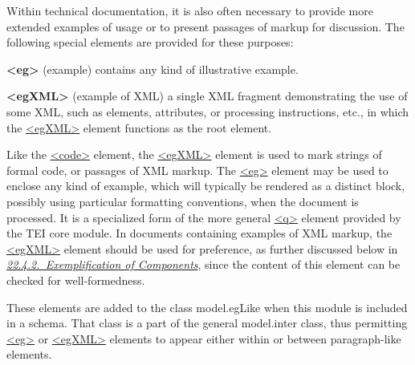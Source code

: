 Within technical documentation, it is also often necessary to provide more extended examples of usage or to present passages of markup for discussion. The following special elements are provided for these purposes: 
\begin{sansreflist}
  
\item [\textbf{<eg>}] (example) contains any kind of illustrative example.
\item [\textbf{<egXML>}] (example of XML) a single XML fragment demonstrating the use of some XML, such as elements, attributes, or processing instructions, etc., in which the \hyperref[TEI.egXML]{<egXML>} element functions as the root element.
\end{sansreflist}
\par
Like the \hyperref[TEI.code]{<code>} element, the \hyperref[TEI.egXML]{<egXML>} element is used to mark strings of formal code, or passages of XML markup. The \hyperref[TEI.eg]{<eg>} element may be used to enclose any kind of example, which will typically be rendered as a distinct block, possibly using particular formatting conventions, when the document is processed. It is a specialized form of the more general \hyperref[TEI.q]{<q>} element provided by the TEI core module. In documents containing examples of XML markup, the \hyperref[TEI.egXML]{<egXML>} element should be used for preference, as further discussed below in \textit{\hyperref[TDeg]{22.4.2.\ Exemplification of Components}}, since the content of this element can be checked for well-formedness.\par
These elements are added to the class \textsf{model.egLike} when this module is included in a schema. That class is a part of the general \textsf{model.inter} class, thus permitting \hyperref[TEI.eg]{<eg>} or \hyperref[TEI.egXML]{<egXML>} elements to appear either within or between paragraph-like elements.
